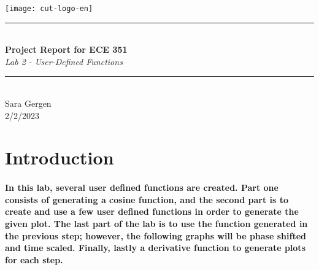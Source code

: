 \documentclass[12pt,a4paper]{article}
\newcommand{\HRule}{\rule{\linewidth}{0.5mm}}
\begin{document}
\begin{titlepage}
\begin{center}

\texttt{[image: cut-logo-en]}~\\[2cm]


\HRule \\[0.4cm]
{ \LARGE 
  \textbf{Project Report for ECE 351}\\[0.4cm]
  \emph{ Lab 2 - User-Defined Functions}\\[0.4cm]
}
\HRule \\[1.5cm]



{ \large
  Sara Gergen \\[0.1cm]
  2/2/2023\\[0.1cm]
}

\vfill




 
\end{center}
\end{titlepage}


\newpage



\tableofcontents
{}
\newpage
\setcounter{page}{1}

\section{Introduction}\label{sec:intro}



\paragraph{    In this lab, several user defined functions are created. Part one consists of generating a cosine function, and the second part is to create and use a few user defined functions in order to generate the given plot. The last part of the lab is to use the function generated in the previous step; however, the following graphs will be phase shifted and time scaled. Finally, lastly a derivative function to generate plots for each step. }
\end{document}
